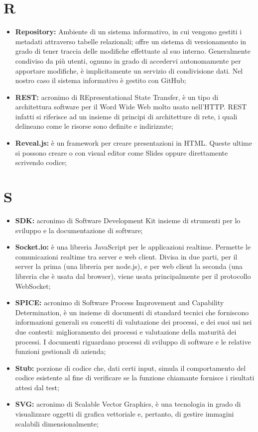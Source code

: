 \section*{R} %
\label{sec:r}
	\begin{itemize}
		\item \textbf{Repository:} Ambiente di un sistema informativo, in cui vengono gestiti i metadati attraverso tabelle relazionali; offre un sistema di versionamento in grado di tener traccia delle modifiche effettuate al suo interno. Generalmente condiviso da più utenti, ognuno in grado di accedervi autonomamente per apportare modifiche, è implicitamente un servizio di condivisione dati. Nel nostro caso il sistema informativo è gestito con GitHub;		
		\item \textbf{REST:} acronimo di REpresentational State Transfer, è un tipo di architettura software per il Word Wide Web molto usato nell'HTTP. REST infatti si riferisce ad un insieme di principi di architetture di rete, i quali delineano come le risorse sono definite e indirizzate;
		\item \textbf{Reveal.js:} è un framework per creare presentazioni in HTML. Queste ultime si possono creare o con visual editor come Slides oppure direttamente scrivendo codice;
		\end{itemize}
\pagebreak


\section*{S} %
\label{sec:s}
	\begin{itemize}
		\item \textbf{SDK:} acronimo di Software Development Kit insieme di strumenti per lo sviluppo e la documentazione di software;	
		\item \textbf{Socket.io:} è una libreria JavaScript per le applicazioni realtime. Permette le comunicazioni realtime tra server e web client. Divisa in due parti, per il server la prima (una libreria per node.js), e per web client la seconda (una libreria che è usata dal browser), viene usata principalmente per il protocollo WebSocket;
		\item \textbf{SPICE:} acronimo di Software Process Improvement and Capability Determination, è un insieme di documenti di standard tecnici che forniscono informazioni generali su concetti di valutazione dei processi, e dei suoi usi nei due contesti: miglioramento dei processi e valutazione della maturità dei processi. I documenti riguardano processi di sviluppo di software e le relative funzioni gestionali di azienda;
		\item \textbf{Stub:} porzione di codice che, dati certi input, simula il comportamento del codice esistente al fine di verificare se la funzione chiamante fornisce i risultati attesi dal test;	
		\item \textbf{SVG:} acronimo di Scalable Vector Graphics, è una tecnologia in grado di visualizzare oggetti di grafica vettoriale e, pertanto, di gestire immagini scalabili dimensionalmente;
	\end{itemize}
\pagebreak

